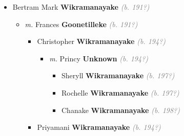 \documentclass[10pt, openany]{book}
\begin{document}
\begin{itemize}
{\begin{itemize}
{\begin{itemize}
{\begin{itemize}
{\begin{itemize}
{\begin{itemize}
{\begin{itemize}
\item{\textit{m.} Clover \textbf{Unknown} \textcolor{gray}{\textit{(b. 194?)}}   \label{couple:00003868:00003869} \begin{itemize}
\item{Sheron \textbf{Wikramanayake} \textcolor{gray}{\textit{(b. 197?)}}
 }
\item{Nirupa \textbf{Wikramanayake} \textcolor{gray}{\textit{(b. 197?)}}
 }
\end{itemize}}
\end{itemize}
 }
\item{Malkanthie \textbf{Wikramanayake} \textcolor{gray}{\textit{(b. 194?)}}
 }
\end{itemize}}
\end{itemize}
  }
\item{Bertram Mark \textbf{Wikramanayake} \textcolor{gray}{\textit{(b. 191?)}}
\begin{itemize}
\item{\textit{m.} Frances \textbf{Goonetilleke} \textcolor{gray}{\textit{(b. 191?)}}   \label{couple:00003761:00003873} \begin{itemize}
\item{Christopher \textbf{Wikramanayake} \textcolor{gray}{\textit{(b. 194?)}}
\begin{itemize}
\item{\textit{m.} Princy \textbf{Unknown} \textcolor{gray}{\textit{(b. 194?)}}   \label{couple:00003874:00003875} \begin{itemize}
\item{Sheryll \textbf{Wikramanayake} \textcolor{gray}{\textit{(b. 197?)}}
 }
\item{Rochelle \textbf{Wikramanayake} \textcolor{gray}{\textit{(b. 197?)}}
 }
\item{Chanake \textbf{Wikramanayake} \textcolor{gray}{\textit{(b. 198?)}}
 }
\end{itemize}}
\end{itemize}
 }
\item{Priyamani \textbf{Wikramanayake} \textcolor{gray}{\textit{(b. 194?)}}
 }
\end{itemize}}

\end{itemize}}
\end{itemize}}
\end{itemize}}
\end{itemize}}
\end{itemize}
\end{document}
